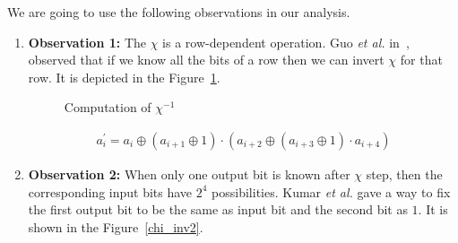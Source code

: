 \documentclass[runningheads]{llncs}
\newcommand{\etal}{\textit{et al. }}
\begin{document}

We are going to use the following observations in our analysis.
\begin{enumerate}
\item \label{ob1}\textbf{Observation 1:} The $\chi$ is a row-dependent operation. Guo \etal in~\cite{guo2016linear}, observed that if we know all the bits of a row then we can invert $\chi$ for that row. It is depicted in the Figure~\ref{chi_inv}.
\begin{figure}
\begin{center}
\end{center}
\caption{Computation of $\chi^{-1}$\label{chi_inv}}
\end{figure}
\begin{align}
a_i^\prime = a_i \oplus \left( a_{i+1} \oplus 1\right) \cdot \left( a_{i+2} \oplus \left( a_{i+3} \oplus 1 \right) \cdot a_{i+4}\right)
\end{align}


\item \label{ob2}\textbf{Observation 2:} When only one output bit is known after $\chi$ step, then the corresponding input bits have $2^4$ possibilities. Kumar \etal\cite{kumar2018cryptanalysis} gave a way to fix the first output bit to be the same as input bit and the second bit as $1$. It is shown in the Figure~\ref{chi_inv2}.

\begin{figure}[ht]
\begin{center}
\end{center}
\end{figure}
\end{enumerate}
\end{document}
